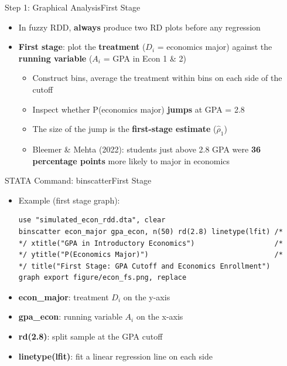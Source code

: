 \documentclass[hyperref={pdfpagelabels=false}]{beamer}
\begin{document}
\begin{frame}{Step 1: Graphical Analysis}{First Stage}
	\begin{itemize}
		\item In fuzzy RDD, \textbf{always} produce two RD plots before any regression
		\vspace{0.2cm}
		\item \textbf{First stage}: plot the \textbf{treatment} ($D_i$ = economics major)
		against the \textbf{running variable} ($A_i$ = GPA in Econ 1 \& 2)
		\vspace{0.2cm}
		\begin{itemize}
			\item Construct bins, average the treatment within bins on each side of the cutoff
			\vspace{0.2cm}
			\item Inspect whether P(economics major) \textbf{jumps} at GPA = 2.8
			\vspace{0.2cm}
			\item The size of the jump is the \textbf{first-stage estimate} ($\hat{\rho}_1$)
			\vspace{0.2cm}
			\item Bleemer \& Mehta (2022): students just above 2.8 GPA were
			\textbf{36 percentage points} more likely to major in economics
		\end{itemize}
	\end{itemize}
\end{frame}


\begin{frame}[fragile]{STATA Command: binscatter}{First Stage}
	\begin{itemize}
		\item Example (first stage graph):
\begin{lstlisting}
use "simulated_econ_rdd.dta", clear
binscatter econ_major gpa_econ, n(50) rd(2.8) linetype(lfit) /*
*/ xtitle("GPA in Introductory Economics")                   /*
*/ ytitle("P(Economics Major)")                              /*
*/ title("First Stage: GPA Cutoff and Economics Enrollment")
graph export figure/econ_fs.png, replace
\end{lstlisting}
		\vspace{0.2cm}
		\item \textbf{econ\_major}: treatment $D_i$ on the y-axis
		\vspace{0.2cm}
		\item \textbf{gpa\_econ}: running variable $A_i$ on the x-axis
		\vspace{0.2cm}
		\item \textbf{rd(2.8)}: split sample at the GPA cutoff
		\vspace{0.2cm}
		\item \textbf{linetype(lfit)}: fit a linear regression line on each side
	\end{itemize}
\end{frame}
\end{document}
